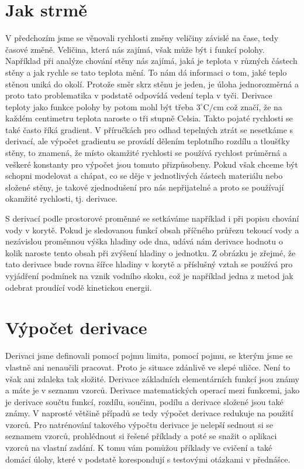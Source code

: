 \documentclass[12pt]{article}
\begin{document}
\newpage
\section*{Jak strmě}

V předchozím jsme se věnovali rychlosti změny veličiny závislé na čase, tedy časové změně. Veličina, která nás zajímá, však může být i funkcí polohy. Například při analýze chování stěny nás zajímá, jaká je teplota v různých částech stěny a jak rychle se tato teplota mění. To nám dá informaci o tom, jaké teplo stěnou uniká do okolí. Protože směr skrz stěnu je jeden, je úloha jednorozměrná a proto tato problematika v podstatě odpovídá vedení tepla v tyči. Derivace teploty jako funkce polohy by potom mohl být třeba $3 ^\circ\mathrm{C}/\mathrm{cm}$ což značí, že na každém centimetru teplota naroste o tři stupně Celsia. Takto pojaté rychlosti se také často říká gradient. V příručkách pro odhad tepelných ztrát se nesetkáme s derivací, ale výpočet gradientu se provádí dělením teplotního rozdílu a tloušťky stěny, to znamená, že místo okamžité rychlosti se používá rychlost průměrná a veškeré konstanty pro výpočet jsou tomuto přizpůsobeny. Pokud však chceme být schopni modelovat a chápat, co se děje v jednotlivých částech materiálu nebo složené stěny, je takové zjednodušení pro nás nepřijatelné a proto se používají okamžité rychlosti, tj. derivace.

S derivací podle prostorové proměnné se setkáváme například i při popisu chování vody v korytě. Pokud je sledovanou funkcí obsah příčného průřezu tekoucí vody a nezávislou proměnnou výška hladiny ode dna, udává nám derivace hodnotu o kolik naroste tento obsah při zvýšení hladiny o jednotku. Z obrázku je zřejmé, že tato derivace bude rovna šířce hladiny v korytě a příslušný vztah se používá pro vyjádření podmínek na vznik vodního skoku, což je například jedna z metod jak odebrat proudící vodě kinetickou energii.

\newpage

\section*{Výpočet derivace}

Derivaci jsme definovali pomocí pojmu limita, pomocí pojmu, se kterým jsme se vlastně ani nenaučili pracovat. Proto je situace zdánlivě ve slepé uličce. Není to však ani zdaleka tak složité. Derivace základních elementárních funkcí jsou známy a máte je v seznamu vzorců. Derivace matematických operací mezi funkcemi, jako je derivace součtu funkcí, rozdílu, součinu, podílu a derivace složené jsou také známy. V naprosté většině případů se tedy výpočet derivace redukuje na použití vzorců. Pro natrénování takového výpočtu derivace je nelepší sednout si se seznamem vzorců, prohlédnout si řešené příklady a poté se snažit o aplikaci vzorců na vlastní zadání. K tomu vám pomůžou příklady ve cvičení a také domácí úlohy, které v podstatě korespondují s testovými otázkami v přednášce.
\end{document}
